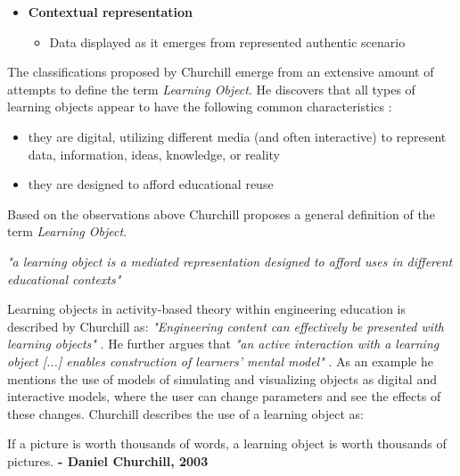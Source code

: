 \begin{kasse} 
\begin{itemize}
      \vspace{-4mm}
      \begin{itemize}
          \item Display of information organized and represented with modalities
    \end{itemize}
    \vspace{-3mm}
  \item \textbf{Contextual representation}
      \vspace{-4mm}
      \begin{itemize}
          \item Data displayed as it emerges from represented authentic scenario
    \end{itemize}
\end{itemize}
\end{kasse}

\noindent 
The classifications proposed by Churchill emerge from an extensive amount of attempts to define the term \textit{Learning Object}. He discovers that all types of learning objects appear to have the following common characteristics \cite[p. 4]{Churchill2006}:
\begin{itemize}
  \item they are digital, utilizing different media (and often interactive) to represent data, information, ideas, knowledge, or reality
  \item they are designed to afford educational reuse
\end{itemize}

\noindent Based on the observations above Churchill proposes a general definition of the term \textit{Learning Object}.

\begin{definition} 
\textit{"a learning object is a mediated representation designed to afford uses in different educational contexts"} \cite[p. 4]{Churchill2006}
\end{definition}

\noindent
Learning objects in activity-based theory within engineering education is described by Churchill as: \textit{"Engineering content can effectively be presented with learning objects"} \cite[p. 5]{churchill2003effective}. 
He further argues that \textit{"an active interaction with a learning object [...] enables construction of learners' mental model"} \cite[p.1]{churchill2003effective}. As an example he mentions the use of models of simulating and visualizing objects as digital and interactive models, where the user can change parameters and see the effects of these changes. Churchill describes the use of a learning object as:
\begin{citat} []
If a picture is worth thousands of words, a learning object is worth thousands of pictures. \textbf{- Daniel Churchill, 2003} \cite[p. 5]{churchill2003effective}
\end{citat}


